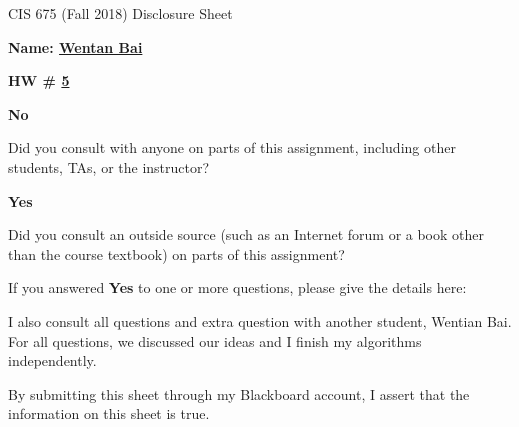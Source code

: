 \documentclass[12pt]{article}
\newcommand*\circled[1]{\tikz[baseline=(char.base)]{
            \node[shape=circle,draw,inner sep=2pt] (char) {#1};}}
\begin{document}
\begin{center}
  \Large
  CIS 675 (Fall 2018) Disclosure Sheet 
\end{center} 
\vspace*{2em}

\noindent
\textbf{\Large Name: \underline{ Wentan Bai }} 


\noindent 
\begin{minipage}[t]{1.0\linewidth}

\begin{minipage}[t]{0.25\linewidth}
\textbf{\Large
  HW \# \underline{ 5 }
} 

\end{minipage} \vspace*{3ex}




\begin{minipage}[t]{.8in}
  \textbf{\circled{Yes} \quad No}
\end{minipage}
\qquad 
\begin{minipage}[t]{5.5in}
  Did you consult with anyone on parts of this assignment, including other students, TAs, or the instructor? 
\end{minipage}
\vspace*{1ex}

\begin{minipage}[t]{.8in}
  \textbf{Yes \quad \circled{No}}
\end{minipage}
\qquad 
\begin{minipage}[t]{5.5in}
  Did you consult an outside source (such as an Internet forum or a
  book other than the course textbook) on parts of this assignment? 
\end{minipage}
\vspace*{1ex}

\noindent
  If you answered \textbf{Yes} to one or more questions, please give the details here: \vspace*{5ex} \par
  I also consult all questions and extra question with another student, Wentian Bai. For all questions, we discussed our ideas and I finish my algorithms independently. 


\vfill
\end{minipage}



\vspace*{40ex}

By submitting this sheet through my Blackboard account, I assert that the information on this sheet is true.
\end{document}

